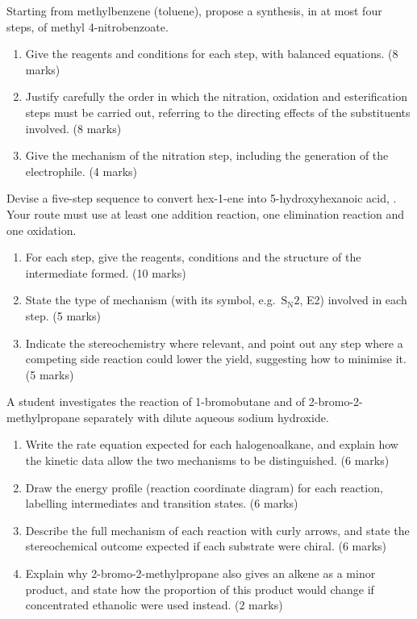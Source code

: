 \documentclass[11pt]{article}
\begin{document}
\begin{exercice}
Starting from methylbenzene (toluene), propose a synthesis, in at most four steps, of methyl 4-nitrobenzoate.
\begin{enumerate}
\item Give the reagents and conditions for each step, with balanced equations. \hfill (8 marks)
\item Justify carefully the order in which the nitration, oxidation and esterification steps must be carried out, referring to the directing effects of the substituents involved. \hfill (8 marks)
\item Give the mechanism of the nitration step, including the generation of the electrophile. \hfill (4 marks)
\end{enumerate}
\end{exercice}

\begin{exercice}
Devise a five-step sequence to convert hex-1-ene into 5-hydroxyhexanoic acid, . Your route must use at least one addition reaction, one elimination reaction and one oxidation.
\begin{enumerate}
\item For each step, give the reagents, conditions and the structure of the intermediate formed. \hfill (10 marks)
\item State the type of mechanism (with its symbol, e.g.\ $\mathrm{S_N2}$, E2) involved in each step. \hfill (5 marks)
\item Indicate the stereochemistry where relevant, and point out any step where a competing side reaction could lower the yield, suggesting how to minimise it. \hfill (5 marks)
\end{enumerate}
\end{exercice}

\begin{exercice}
A student investigates the reaction of 1-bromobutane and of 2-bromo-2-methylpropane separately with dilute aqueous sodium hydroxide.
\begin{enumerate}
\item Write the rate equation expected for each halogenoalkane, and explain how the kinetic data allow the two mechanisms to be distinguished. \hfill (6 marks)
\item Draw the energy profile (reaction coordinate diagram) for each reaction, labelling intermediates and transition states. \hfill (6 marks)
\item Describe the full mechanism of each reaction with curly arrows, and state the stereochemical outcome expected if each substrate were chiral. \hfill (6 marks)
\item Explain why 2-bromo-2-methylpropane also gives an alkene as a minor product, and state how the proportion of this product would change if concentrated ethanolic  were used instead. \hfill (2 marks)
\end{enumerate}
\end{exercice}
\end{document}
